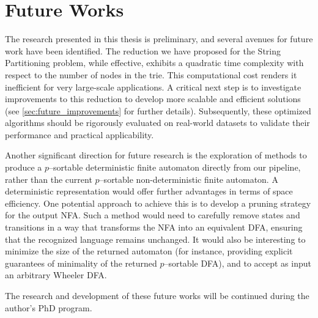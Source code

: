 \section{Future Works}
The research presented in this thesis is preliminary, and several avenues for future work have been identified. The reduction we have proposed for the String Partitioning problem, while effective, exhibits a quadratic time complexity with respect to the number of nodes in the trie. This computational cost renders it inefficient for very large-scale applications. A critical next step is to investigate improvements to this reduction to develop more scalable and efficient solutions (see \cref{sec:future_improvements} for further details). Subsequently, these optimized algorithms should be rigorously evaluated on real-world datasets to validate their performance and practical applicability.

Another significant direction for future research is the exploration of methods to produce a $p$--sortable deterministic finite automaton directly from our pipeline, rather than the current $p$--sortable non-deterministic finite automaton. A deterministic representation would offer further advantages in terms of space efficiency. One potential approach to achieve this is to develop a pruning strategy for the output NFA. Such a method would need to carefully remove states and transitions in a way that transforms the NFA into an equivalent DFA, ensuring that the recognized language remains unchanged. It would also be interesting to minimize the size of the returned automaton (for instance, providing explicit guarantees of minimality of the returned $p$--sortable DFA), and to accept as input an arbitrary Wheeler DFA.

The research and development of these future works will be continued during the author's PhD program.

